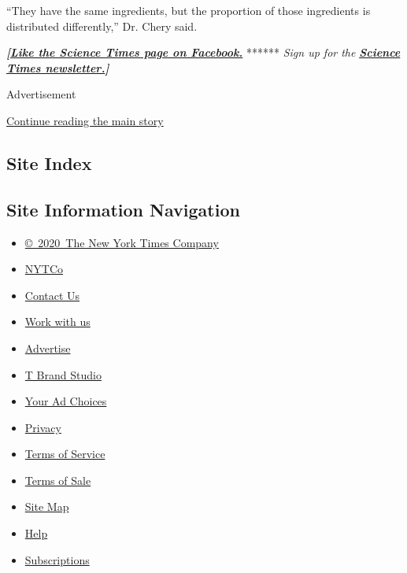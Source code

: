 ``They have the same ingredients, but the proportion of those
ingredients is distributed differently,'' Dr. Chery said.

\textbf{\emph{{[}}\href{http://on.fb.me/1paTQ1h}{\emph{Like the Science
Times page on Facebook.}}} ****** \emph{\textbar{} Sign up for the}
\textbf{\href{http://nyti.ms/1MbHaRU}{\emph{Science Times
newsletter.}}\emph{{]}}}

Advertisement

\protect\hyperlink{after-bottom}{Continue reading the main story}

\hypertarget{site-index}{%
\subsection{Site Index}\label{site-index}}

\hypertarget{site-information-navigation}{%
\subsection{Site Information
Navigation}\label{site-information-navigation}}

\begin{itemize}
\tightlist
\item
  \href{https://help.nytimes3xbfgragh.onion/hc/en-us/articles/115014792127-Copyright-notice}{©~2020~The
  New York Times Company}
\end{itemize}

\begin{itemize}
\tightlist
\item
  \href{https://www.nytco.com/}{NYTCo}
\item
  \href{https://help.nytimes3xbfgragh.onion/hc/en-us/articles/115015385887-Contact-Us}{Contact
  Us}
\item
  \href{https://www.nytco.com/careers/}{Work with us}
\item
  \href{https://nytmediakit.com/}{Advertise}
\item
  \href{http://www.tbrandstudio.com/}{T Brand Studio}
\item
  \href{https://www.nytimes3xbfgragh.onion/privacy/cookie-policy\#how-do-i-manage-trackers}{Your
  Ad Choices}
\item
  \href{https://www.nytimes3xbfgragh.onion/privacy}{Privacy}
\item
  \href{https://help.nytimes3xbfgragh.onion/hc/en-us/articles/115014893428-Terms-of-service}{Terms
  of Service}
\item
  \href{https://help.nytimes3xbfgragh.onion/hc/en-us/articles/115014893968-Terms-of-sale}{Terms
  of Sale}
\item
  \href{https://spiderbites.nytimes3xbfgragh.onion}{Site Map}
\item
  \href{https://help.nytimes3xbfgragh.onion/hc/en-us}{Help}
\item
  \href{https://www.nytimes3xbfgragh.onion/subscription?campaignId=37WXW}{Subscriptions}
\end{itemize}
